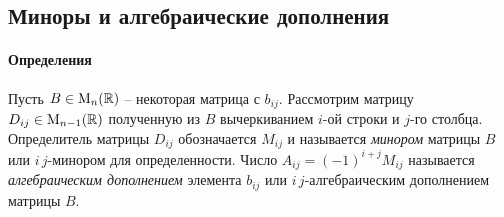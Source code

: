 \subsection{Миноры и алгебраические дополнения}
\label{section::DetMinors}

\paragraph{Определения}

\begin{definition}
\label{def::MinorAndAlgCompl}
Пусть $B\in\operatorname{M}_{n}(\mathbb R)$ -- некоторая матрица с $b_{ij}$.
Рассмотрим матрицу $D_{ij}\in\operatorname{M}_{n-1}(\mathbb R)$ полученную из $B$ вычеркиванием $i$-ой строки и $j$-го столбца.
Определитель матрицы $D_{ij}$ обозначается $M_{ij}$ и называется {\it минором} матрицы $B$ или $i\,j$-минором для определенности.
Число $A_{ij} = (-1)^{i+j}M_{ij}$ называется {\it алгебраическим дополнением} элемента $b_{ij}$ или $i\,j$-алгебраическим дополнением матрицы $B$.
\end{definition}


